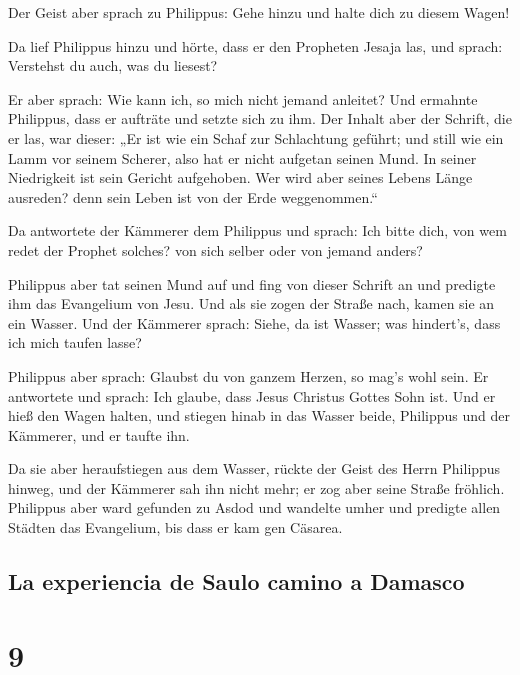  Der Geist aber sprach zu Philippus: Gehe hinzu und halte
dich zu diesem Wagen!

 Da lief Philippus hinzu und hörte, dass er den Propheten
Jesaja las, und sprach: Verstehst du auch, was du liesest?

 Er aber sprach: Wie kann ich, so mich nicht jemand
anleitet? Und ermahnte Philippus, dass er aufträte und setzte sich zu
ihm.  Der Inhalt aber der Schrift, die er las, war
dieser: „Er ist wie ein Schaf zur Schlachtung geführt; und still wie ein
Lamm vor seinem Scherer, also hat er nicht aufgetan seinen Mund.
 In seiner Niedrigkeit ist sein Gericht aufgehoben. Wer
wird aber seines Lebens Länge ausreden? denn sein Leben ist von der Erde
weggenommen.``

 Da antwortete der Kämmerer dem Philippus und sprach: Ich
bitte dich, von wem redet der Prophet solches? von sich selber oder von
jemand anders?

 Philippus aber tat seinen Mund auf und fing von dieser
Schrift an und predigte ihm das Evangelium von Jesu.  Und
als sie zogen der Straße nach, kamen sie an ein Wasser. Und der Kämmerer
sprach: Siehe, da ist Wasser; was hindert's, dass ich mich taufen lasse?

 Philippus aber sprach: Glaubst du von ganzem Herzen, so
mag's wohl sein. Er antwortete und sprach: Ich glaube, dass Jesus
Christus Gottes Sohn ist.  Und er hieß den Wagen halten,
und stiegen hinab in das Wasser beide, Philippus und der Kämmerer, und
er taufte ihn.

 Da sie aber heraufstiegen aus dem Wasser, rückte der
Geist des Herrn Philippus hinweg, und der Kämmerer sah ihn nicht mehr;
er zog aber seine Straße fröhlich.  Philippus aber ward
gefunden zu Asdod und wandelte umher und predigte allen Städten das
Evangelium, bis dass er kam gen Cäsarea.

\hypertarget{la-experiencia-de-saulo-camino-a-damasco}{%
\subsection{La experiencia de Saulo camino a
Damasco}\label{la-experiencia-de-saulo-camino-a-damasco}}

\hypertarget{section-8}{%
\section{9}\label{section-8}}

